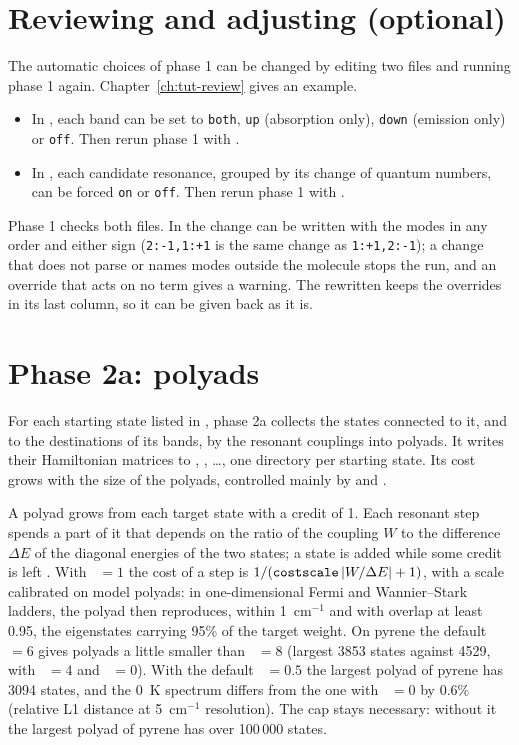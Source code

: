 \section{Reviewing and adjusting (optional)}

The automatic choices of phase 1 can be changed by editing two files and
running phase 1 again. Chapter~\ref{ch:tut-review} gives an example.
\begin{itemize}
\item In , each band can be set to \texttt{both},
  \texttt{up} (absorption only), \texttt{down} (emission only) or
  \texttt{off}. Then rerun phase 1 with .
\item In , each candidate resonance, grouped by
  its change of quantum numbers, can be forced \texttt{on} or
  \texttt{off}. Then rerun phase 1 with .
\end{itemize}
Phase 1 checks both files. In  the change can be
written with the modes in any order and either sign (\texttt{2:-1,1:+1}
is the same change as \texttt{1:+1,2:-1}); a change that does not parse
or names modes outside the molecule stops the run, and an override that
acts on no term gives a warning. The rewritten
 keeps the overrides in its last column, so it
can be given back as it is.

\section{Phase 2a: polyads}

For each starting state listed in , phase 2a collects the
states connected to it, and to the destinations of its bands, by the
resonant couplings into polyads. It writes their Hamiltonian matrices to
, , \ldots, one directory per starting
state. Its cost grows with the size of the polyads, controlled mainly by
 and .

A polyad grows from each target state with a credit of 1. Each resonant
step spends a part of it that depends on the ratio of the coupling $W$ to
the difference $\Delta E$ of the diagonal energies of the two states; a
state is added while some credit is left . With
~$=1$ the cost of a step is $1/(\opt{costscale}\,|W/\Delta
E|+1)$, with a scale calibrated on model polyads: in one-dimensional Fermi and
Wannier--Stark ladders, the polyad then reproduces, within 1~cm$^{-1}$ and
with overlap at least 0.95, the eigenstates carrying 95\% of the target
weight. On pyrene the default ~$=6$ gives polyads a
little smaller than ~$=8$ (largest 3853 states against
4529, with ~$=4$ and ~$=0$). With the default ~$=0.5$ the largest polyad of pyrene has 3094 states, and the 0~K spectrum differs from the one with ~$=0$ by 0.6\% (relative L1 distance at 5~cm$^{-1}$ resolution). The cap  stays necessary: without it the largest
polyad of pyrene has over 100\,000 states.

